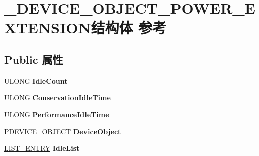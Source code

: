 \hypertarget{struct___d_e_v_i_c_e___o_b_j_e_c_t___p_o_w_e_r___e_x_t_e_n_s_i_o_n}{}\section{\+\_\+\+D\+E\+V\+I\+C\+E\+\_\+\+O\+B\+J\+E\+C\+T\+\_\+\+P\+O\+W\+E\+R\+\_\+\+E\+X\+T\+E\+N\+S\+I\+O\+N结构体 参考}
\label{struct___d_e_v_i_c_e___o_b_j_e_c_t___p_o_w_e_r___e_x_t_e_n_s_i_o_n}
\subsection*{Public 属性}
\begin{DoxyCompactItemize}
\item 
\mbox{\label{struct___d_e_v_i_c_e___o_b_j_e_c_t___p_o_w_e_r___e_x_t_e_n_s_i_o_n_a8448ae19c8197bced9455eb0ed83a803}} 
U\+L\+O\+NG {\bfseries Idle\+Count}
\item 
\mbox{\label{struct___d_e_v_i_c_e___o_b_j_e_c_t___p_o_w_e_r___e_x_t_e_n_s_i_o_n_a329895725af33a27206675fa72849ad2}} 
U\+L\+O\+NG {\bfseries Conservation\+Idle\+Time}
\item 
\mbox{\label{struct___d_e_v_i_c_e___o_b_j_e_c_t___p_o_w_e_r___e_x_t_e_n_s_i_o_n_af65ad890a209935a129fe6089de108e3}} 
U\+L\+O\+NG {\bfseries Performance\+Idle\+Time}
\item 
\mbox{\label{struct___d_e_v_i_c_e___o_b_j_e_c_t___p_o_w_e_r___e_x_t_e_n_s_i_o_n_af8823efca17b08fa3968f3d88ddfa583}} 
\hyperlink{struct___d_e_v_i_c_e___o_b_j_e_c_t}{P\+D\+E\+V\+I\+C\+E\+\_\+\+O\+B\+J\+E\+CT} {\bfseries Device\+Object}
\item 
\mbox{\label{struct___d_e_v_i_c_e___o_b_j_e_c_t___p_o_w_e_r___e_x_t_e_n_s_i_o_n_a6952fe7162ac2cc0934a187d450d9e25}} 
\hyperlink{struct___l_i_s_t___e_n_t_r_y}{L\+I\+S\+T\+\_\+\+E\+N\+T\+RY} {\bfseries Idle\+List}

\end{DoxyCompactItemize}
